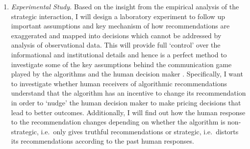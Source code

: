 \documentclass[12pt,a4paper]{article}
\begin{document}
\begin{enumerate}
\item \emph{Experimental Study.} Based on the insight from the empirical analysis of the strategic interaction, I will design a laboratory experiment to follow up important assumptions and key mechanism of how recommendations are exaggerated and mapped into decisions which cannot be addressed by analysis of observational data. This will provide full `control' over the informational and institutional details and hence is a perfect method to investigate some of the key assumptions behind the communication game played by the algorithms and the human decision maker \citep[for an overview of human vs computer players in controlled economic experiments, see][]{march2019behavioral}.
%
Specifically, I want to investigate whether human receivers of algorithmic recommendations understand that the algorithm has an incentive to change its recommendation in order to `nudge' the human decision maker to make pricing decisions that lead to better outcomes. Additionally, I will find out how the human response to the recommendation changes depending on whether the algorithm is non-strategic, i.e.~only gives truthful recommendations or strategic, i.e.~distorts its recommendations according to the past human responses.

\end{enumerate}



\pagebreak
\renewcommand\refname{Bibliography}


\end{document}
